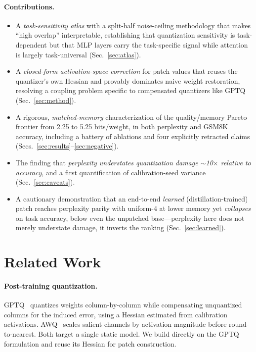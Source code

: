 \documentclass[manuscript, screen, review]{jair}
\newcommand{\bpw}{bits/weight}
\begin{document}
\paragraph{Contributions.}
\begin{itemize}
  \item A \emph{task-sensitivity atlas} with a split-half noise-ceiling
    methodology that makes ``high overlap'' interpretable, establishing that
    quantization sensitivity is task-dependent but that MLP layers carry the
    task-specific signal while attention is largely task-universal
    (Sec.~\ref{sec:atlas}).
  \item A \emph{closed-form activation-space correction} for patch values that
    reuses the quantizer's own Hessian and provably dominates naive
    weight restoration, resolving a coupling problem specific to
    compensated quantizers like GPTQ (Sec.~\ref{sec:method}).
  \item A rigorous, \emph{matched-memory} characterization of the
    quality/memory Pareto frontier from 2.25 to 5.25 \bpw{}, in both
    perplexity and GSM8K accuracy, including a battery of ablations and four
    explicitly retracted claims (Secs.~\ref{sec:results}--\ref{sec:negative}).
  \item The finding that \emph{perplexity understates quantization damage
    $\sim$10$\times$ relative to accuracy}, and a first quantification of
    calibration-seed variance (Sec.~\ref{sec:caveats}).
  \item A cautionary demonstration that an end-to-end \emph{learned}
    (distillation-trained) patch reaches perplexity parity with uniform-4 at
    lower memory yet \emph{collapses} on task accuracy, below even the
    unpatched base---perplexity here does not merely understate damage, it
    inverts the ranking (Sec.~\ref{sec:learned}).
\end{itemize}

\section{Related Work}

\paragraph{Post-training quantization.} GPTQ~\cite{frantar2022gptq} quantizes
weights column-by-column while compensating unquantized columns for the
induced error, using a Hessian estimated from calibration activations.
AWQ~\cite{lin2023awq} scales salient channels by activation magnitude before
round-to-nearest. Both target a single static model. We build directly on the
GPTQ formulation and reuse its Hessian for patch construction.
\end{document}
